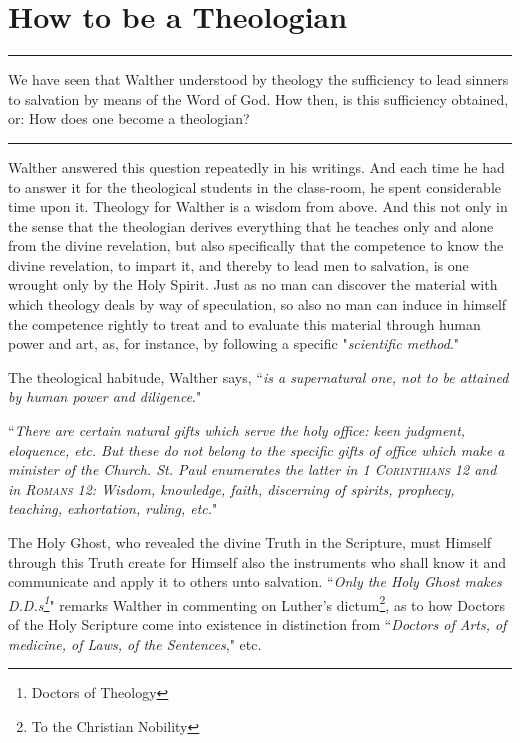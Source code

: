 \chapter{How to be a Theologian}
\hrule
\vspace{.30cm}
We have seen that Walther understood by theology the sufficiency to lead sinners to salvation by means of the Word of God. How then, is this sufficiency obtained, or: How does one become a theologian?
\vspace{.10cm}
\hrule
\vspace{1.25cm}
Walther answered this question repeatedly in his writings. And each time he had to answer it for the theological students in the class-room, he spent considerable time upon it.  Theology for Walther is a wisdom from above. And this not only in the sense that the theologian derives everything that he teaches only and alone from the divine revelation, but also specifically that the competence to know the divine revelation, to impart it, and thereby to lead men to salvation, is one wrought only by the Holy Spirit.  Just as no man can discover the material with which theology deals by way of speculation, so also no man can induce in himself the competence rightly to treat and to evaluate this material through human power and art, as, for instance, by following a specific "\textit{scientific method}."

The theological habitude, Walther says, ``\textit{is a supernatural one, not to be attained by human power and diligence}." \begin{displayquote}``\textit{There are certain natural gifts which serve the holy office: keen judgment, eloquence, etc. But these do not belong to the specific gifts of office which make a minister of the Church. St. Paul enumerates the latter in {\scriptsize\textsc{1 Corinthians 12}} and in {\scriptsize\textsc{Romans 12}}: Wisdom, knowledge, faith, discerning of spirits, prophecy, teaching, exhortation, ruling, etc.}" \end{displayquote}The Holy Ghost, who revealed the divine Truth in the Scripture, must Himself through this Truth create for Himself also the instruments who shall know it and communicate and apply it to others unto salvation. ``\textit{Only the Holy Ghost makes D.D.s\footnote{Doctors of Theology}}" remarks Walther in commenting on Luther's dictum\footnote{To the Christian Nobility}, as to how Doctors of the Holy Scripture come into existence in distinction from ``\textit{Doctors of Arts, of medicine, of Laws, of the Sentences}," etc.

